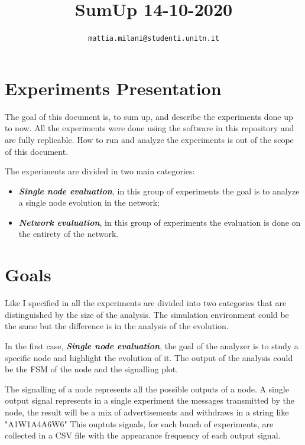 \documentclass[10pt,conference,letterpaper]{IEEEtran}
\begin{document}
\title{SumUp 14-10-2020}
\author{
    \texttt{mattia.milani@studenti.unitn.it}
}


\maketitle

\section{Experiments Presentation}
\label{sec:mainIdea}

The goal of this document is, to sum up, and describe the experiments done up to 
now.
All the experiments were done using the software in this repository and are
fully replicable.
How to run and analyze the experiments is out of the scope of this document.

The experiments are divided in two main categories:
\begin{itemize}
	\item \textit{\textbf{Single node evaluation}}, in this group of experiments
		the goal is to analyze a single node evolution in the network;
	\item \textit{\textbf{Network evaluation}}, in this group of experiments 
		the evaluation is done on the entirety of the network.
\end{itemize}

\section{Goals}
\label{sec:goals}

Like I specified in  all the experiments are divided into two
categories that are distinguished by the size of the analysis.
The simulation environment could be the same but the difference is in the
analysis of the evolution.

In the first case, \textit{\textbf{Single node evaluation}}, the goal of the
analyzer is to study a specific node and highlight the evolution of it.
The output of the analysis could be the \ac{FSM} of the node and the signalling
plot.

The signalling of a node represents all the possible outputs of a node.
A single output signal represents in a single experiment the messages transmitted
by the node, the result will be a mix of advertisements and withdraws in
a string like "A1W1A4A6W6"
This ouptuts signals, for each bunch of experiments, are collected in a CSV file
with the appearance frequency of each output signal.
\end{document}
